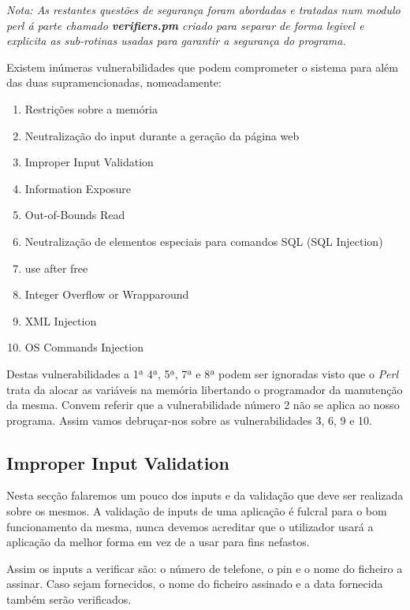 \textit{Nota: As restantes questões de segurança foram abordadas e tratadas num modulo perl á parte chamado \textbf{verifiers.pm} criado para separar de forma legivel e explicita as sub-rotinas usadas para garantir a segurança do programa.}\newline 

Existem inúmeras vulnerabilidades que podem comprometer o sistema para além das duas supramencionadas, nomeadamente:

\begin{enumerate}
\item Restrições sobre a memória
\item Neutralização do input durante a geração da página web
\item Improper Input Validation
\item Information Exposure
\item Out-of-Bounds Read
\item Neutralização de elementos especiais para comandos SQL (SQL Injection)
\item use after free
\item Integer Overflow or Wrapparound
\item XML Injection
\item OS Commands Injection
\end{enumerate}

Destas vulnerabilidades a 1ª 4ª, 5ª, 7ª e 8ª podem ser ignoradas visto que o \textit{Perl} trata da alocar as variáveis na memória libertando o programador da manutenção da mesma. Convem referir que a vulnerabilidade número 2 não se aplica ao nosso programa. Assim vamos debruçar-nos sobre as vulnerabilidades 3, 6, 9 e 10.  


\subsection{Improper Input Validation}

Nesta secção falaremos um pouco dos inputs e da validação que deve ser realizada sobre os mesmos. A validação de inputs de uma aplicação é fulcral para o bom funcionamento da mesma, nunca devemos acreditar que o utilizador usará a aplicação da melhor forma em vez de a usar para fins nefastos.\newline


Assim os inputs a verificar são:  o número de telefone, o pin e o nome do ficheiro a assinar. Caso sejam fornecidos, o nome do ficheiro assinado e a data fornecida também serão verificados.\newline

